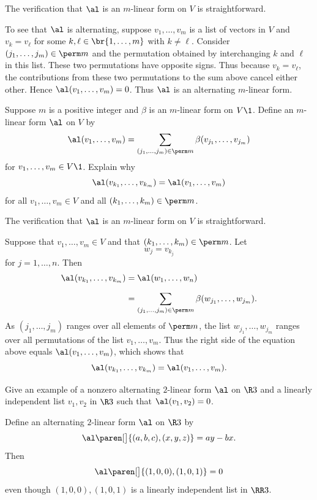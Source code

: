 \begin{Solution}
The verification that $\al$ is an $m$-linear form on $V$ is straightforward.

To see that $\al$ is alternating, suppose $v_1, \ldots, v_m$ is a list of vectors in $V$ and $v_k = v_\ell$ for some
$k, \ell \in \br{1, \ldots, m}$ with $k \ne \ell$. Consider $(j_1, \ldots, j_m) \in \perm m$ and the permutation obtained by interchanging $k$ and $\ell$ in this list. These two permutations have opposite signs. Thus because $v_k = v_\ell$, the contributions from these two permutations to the sum above cancel either other. Hence $\al(v_1, \ldots, v_m) = 0$. Thus $\al$ is an alternating $m$-linear form.
\end{Solution}

\exercise
Suppose $m$ is a positive integer and $\beta$ is an $m$-linear form on $V\1$. Define an $m$-linear form $\al$ on $V$ by
\[
\al(v_1, \ldots, v_m) =
\sum_{(j_1, \ldots, j_m) \in \perm m} \beta( v_{j_1}, \ldots, v_{j_m} )
\]
for $v_1, \ldots, v_m \in V\1$. Explain why
\[
\al( v_{k_1}, \ldots, v_{k_m} ) = \al(v_1, \ldots, v_m)
\]
for all $v_1, \ldots, v_m \in V$ and all $(k_1, \ldots, k_m) \in \perm m$.

\begin{Solution}
The verification that $\al$ is an $m$-linear form on $V$ is straightforward.

Suppose that $v_1, \ldots, v_m \in V$ and that $(k_1, \ldots, k_m) \in \perm m$. Let
\[
w_j = v_{k_j}
\]
for $j = 1, \ldots, n$. Then
\begin{align*}
\al( v_{k_1}, \ldots, v_{k_m} ) &= \al(w_1, \ldots, w_n) \\[6bp]
&= \sum_{(j_1, \ldots, j_m) \in \perm m} \beta(w_{j_1}, \ldots, w_{j_m} ).
\end{align*}
As $(j_1, \ldots, j_m)$ ranges over all elements of $\perm m$, the list $w_{j_1}, \ldots, w_{j_m}$ ranges over all permutations of the list
$v_1, \ldots, v_m$. Thus the right side of the equation above equals $\al(v_1, \ldots, v_m)$, which shows that
\[
\al( v_{k_1}, \ldots, v_{k_m} ) = \al(v_1, \ldots, v_m).
\]
\end{Solution}

\exercise
Give an example of a nonzero alternating $2$-linear form $\al$ on $\R3$ and a linearly independent list $v_1, v_2$ in $\R3$ such that
$\al(v_1, v_2) = 0$.

\begin{Solution}
Define an alternating $2$-linear form $\al$ on $\R3$ by
\[
\al\paren[\big]{ (a, b, c), (x, y, z) } = ay - bx.
\]
Then
\[
\al\paren[\big]{ (1, 0, 0), (1, 0, 1) } = 0
\]
even though $(1, 0, 0), (1, 0, 1)$ is a linearly independent list in $\RR3$.
\end{Solution}

